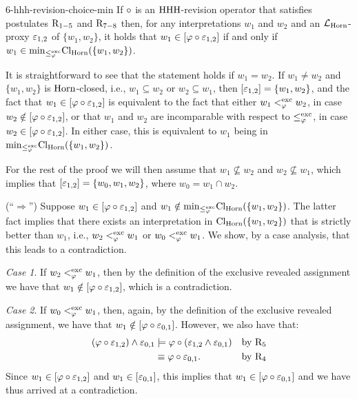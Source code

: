 \begin{lem}{}{6-hhh-revision-choice-min}
	If $\circ$ is an ${\mathrm{HHH}}$-revision operator that 
	satisfies postulates $\mathrm{R}_{1-5}$ and $\mathrm{R}_{7-8}$
	then, for any interpretations $w_1$ and $w_2$
	and an $\mathcal{L}_{\mathrm{Horn}}$-proxy $\varepsilon_{1,2}$ of $\{w_1,w_2\}$,
	it holds that $w_1 \in [\varphi\circ\varepsilon_{1,2}]$
	if and only if $w_1\in{\operatorname{min}}_{\le^{{\operatorname{exc}}}_{\varphi}}{\operatorname{Cl}}_{\mathrm{Horn}}(\{w_1,w_2\})$.
\end{lem}
\begin{prf*}{}{}%
	It is straightforward to 
	see that the statement holds if $w_1=w_2$.
	If $w_1\neq w_2$ and 
	$\{w_1,w_2\}$ is $\mathrm{Horn}$-closed,
	i.e., $w_1\subseteq w_2$ or $w_2 \subseteq w_1$,
	then $[\varepsilon_{1,2}]=\{w_1,w_2\}$,
	and the fact that $w_1 \in [\varphi\circ\varepsilon_{1,2}]$
	is equivalent to the fact that either 
	$w_1 <^{{\operatorname{exc}}}_{\varphi} w_2$, 
	in case $w_2\notin[\varphi\circ\varepsilon_{1,2}]$,
	or that $w_1$ and $w_2$ are incomparable with respect to 
	$\le^{{\operatorname{exc}}}_{\varphi}$,
	in case $w_2\in[\varphi\circ\varepsilon_{1,2}]$.
	In either case, this is equivalent to $w_1$
	being in ${\operatorname{min}}_{\le^{{\operatorname{exc}}}_{\varphi}}{\operatorname{Cl}}_{\mathrm{Horn}}(\{w_1,w_2\})$.

	For the rest of the proof we will then assume that
	$w_1\nsubseteq w_2$ and $w_2\nsubseteq w_1$,
	which implies that 
	$[\varepsilon_{1,2}]=\{w_0,w_1,w_2\}$,
	where $w_0 = w_1\cap w_2$.

	(``$\Rightarrow$'')
	Suppose $w_1 \in [\varphi\circ\varepsilon_{1,2}]$
	and
	$w_1\notin{\operatorname{min}}_{\le^{{\operatorname{exc}}}_{\varphi}}{\operatorname{Cl}}_{\mathrm{Horn}}(\{w_1,w_2\})$.
	The latter fact implies that there exists an interpretation in 
	${\operatorname{Cl}}_{\mathrm{Horn}}(\{w_1,w_2\})$ that is strictly better than $w_1$,
	i.e.,  
	$w_2 <^{{\operatorname{exc}}}_{\varphi} w_1$
	or 
	$w_0 <^{{\operatorname{exc}}}_{\varphi} w_1$.
	We show, by a case analysis, that this leads to a contradiction.

	\emph{Case 1}.
	If $w_2 <^{{\operatorname{exc}}}_{\varphi} w_1$,
	then by the definition of the exclusive revealed assignment
	we have that $w_1\notin[\varphi\circ\varepsilon_{1,2}]$,
	which is a contradiction.
	
	\emph{Case 2}.
	If $w_0 <^{{\operatorname{exc}}}_{\varphi} w_1$,
	then, again, by the definition of the exclusive revealed assignment,
	we have that $w_1\notin [\varphi\circ\varepsilon_{0,1}]$.
	However, we also have that:
	\begin{align*}
		(\varphi\circ\varepsilon_{1,2})\land\varepsilon_{0,1}&
		\models\varphi\circ(\varepsilon_{1,2}\land\varepsilon_{0,1})&
		\text{by}~\mathrm{R}_{5}\\
						&
		\equiv\varphi\circ\varepsilon_{0,1}.&\text{by}~\mathrm{R}_{4}
	\end{align*}
	Since $w_1\in[\varphi\circ\varepsilon_{1,2}]$ and $w_1\in[\varepsilon_{0,1}]$,
	this implies that $w_1\in[\varphi\circ\varepsilon_{0,1}]$
	and we have thus arrived at a contradiction.


\end{prf*}
